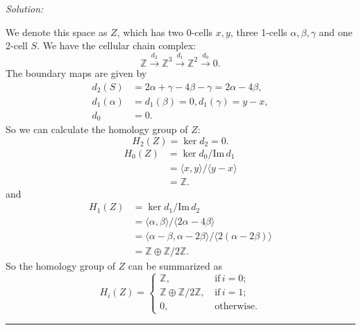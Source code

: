 \documentclass[a4paper, 12pt]{article}
\newenvironment{solution}
    {\textit{Solution:}}
    {}
\newcommand{\im}{\text{Im}\,}
\newcommand{\la}{\langle}
\newcommand{\ra}{\rangle}
\begin{document}
\begin{solution}
\begin{enumerate}[(a)]
We denote this space as \(Z\), which has two 0-cells \(x,y\), three 1-cells \(\alpha,\beta,\gamma\) and one 2-cell \(S\). We have the cellular chain complex:
\[\mathbb{Z}\xrightarrow{d_2}\mathbb{Z}^3\xrightarrow{d_1}\mathbb{Z}^2\xrightarrow{d_0}0.\]
The boundary maps are given by 
\begin{align*}
    d_2(S)&=2\alpha+\gamma-4\beta-\gamma=2\alpha-4\beta,\\ 
    d_1(\alpha)&=d_1(\beta)=0, d_1(\gamma)=y-x,\\ 
    d_0&=0.
\end{align*}
So we can calculate the homology group of \(Z\):
\[H_2(Z)=\ker d_2=0.\]
\begin{align*}
H_0(Z)&=\ker d_0/\im d_1\\ 
      &=\la x,y\ra/\la y-x\ra\\ 
      &=\mathbb{Z}. 
\end{align*}
and 
\begin{align*}
H_1(Z)&=\ker d_1/\im d_2\\
      &=\la \alpha,\beta\ra/\la 2\alpha-4\beta\ra\\ 
      &=\la \alpha-\beta,\alpha-2\beta\ra/\la 2(\alpha-2\beta)\ra\\ 
      &=\mathbb{Z}\oplus \mathbb{Z}/2 \mathbb{Z}.
\end{align*}
So the homology group of \(Z\) can be summarized as 
\[H_i(Z)=\begin{cases}
    \mathbb{Z},&\, \text{if}\, i=0;\\ 
    \mathbb{Z}\oplus \mathbb{Z}/2 \mathbb{Z},&\, \text{if}\, i=1;\\ 
    0,&\, \text{otherwise}.
\end{cases}\]
\end{enumerate}
\end{solution}

\noindent\rule{7in}{2.8pt}

\newpage
\end{document}
